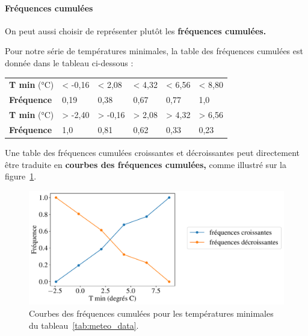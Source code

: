 \paragraph{Fréquences cumulées} 
On peut aussi choisir de représenter plutôt les \textbf{fréquences cumulées.} 

\begin{exemple}
	Pour notre série de températures minimales, la table des fréquences cumulées
	est donnée dans le tableau ci-dessous : \par %
		\vspace*{-.25em}
		\begin{table}[H]\captionsetup{labelformat=empty} 
			\centering
			\begin{tabular}{lb{1.25cm}b{1.25cm}b{1.25cm}b{1.25cm}b{1.25cm}} \toprule[1.5pt] 
				\textbf{T min} (\si{\celsius}) & < -0,16 & < 2,08 & < 4,32 & < 6,56 & < 8,80 \\  
				\textbf{Fréquence} & 0,19 & 0,38 & 0,67 & 0,77 & 1,0 \\ \midrule[1pt]
				\textbf{T min} (\si{\celsius}) & > -2,40 & > -0,16 & > 2,08 & > 4,32 & > 6,56 \\  
				\textbf{Fréquence} & 1,0 & 0,81 & 0,62 & 0,33 & 0,23 \\ 
				\bottomrule[1.5pt]
			\end{tabular}
		\end{table}
		\vspace*{-1em}
		
\end{exemple}

Une table des fréquences cumulées croissantes et décroissantes peut
directement être traduite en \textbf{courbes des fréquences cumulées,} comme
illustré sur la figure~\ref{fig:meteo_tmin_cumul_freq}.
\begin{figure}[h]
	\centering
	\includegraphics[width=.8\textwidth]{figures/stats/meteo_tmin_cumul_freq}
	\caption{Courbes des fréquences cumulées pour les températures minimales du
		tableau~\ref{tab:meteo_data}.}
	\label{fig:meteo_tmin_cumul_freq}
\end{figure}

